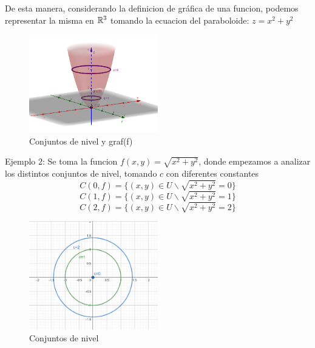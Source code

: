 \begin{definition} 
De esta manera, considerando la definicion de gráfica de una funcion, podemos representar la misma en $\mathbb{R}^3$ tomando  la ecuacion del paraboloide: $z=x^2+y^2$

\begin{figure}[h!] %
    \centering
    \includegraphics[width=0.5\textwidth]{../figs/conjunto1_r3.png} %
    \caption{Conjuntos de nivel y graf(f)}
    \label{fig:ejemplo} %
\end{figure}



 

Ejemplo 2: Se toma la funcion $f(x,y)=\sqrt{x^2+y^2}$, donde empezamos a analizar los distintos conjuntos de nivel, tomando $c$ con diferentes constantes
 \[
C(0,f)=\{(x,y) \in U \backslash \sqrt{x^2+y^2}=0 \}
\]
 \[
C(1,f)=\{(x,y) \in U \backslash \sqrt{x^2+y^2}=1 \}
\]
 \[
C(2,f)=\{(x,y) \in U \backslash \sqrt{x^2+y^2}=2 \}
 \]

\begin{figure}[h!] %
    \centering
    \includegraphics[width=0.5\textwidth]{../figs/conjunto2_r2.png} %
    \caption{Conjuntos de nivel}
    \label{fig:ejemplo} %
\end{figure}


\end{definition}
